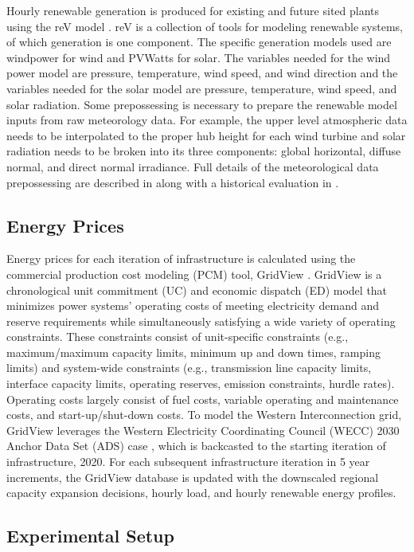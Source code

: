 \documentclass{agujournal2019}
\begin{document}
Hourly renewable generation is produced for existing and future sited plants using the reV model \cite{Maclaurin2019, Buster2023}. reV is a collection of tools for modeling renewable systems, of which generation is one component. The specific generation models used are windpower \cite{windpower} for wind and PVWatts \cite{pvwatts5} for solar. The variables needed for the wind power model are pressure, temperature, wind speed, and wind direction and the variables needed for the solar model are pressure, temperature, wind speed, and solar radiation. Some prepossessing is necessary to prepare the renewable model inputs from raw meteorology data. For example, the upper level atmospheric data needs to be interpolated to the proper hub height for each wind turbine and solar radiation needs to be broken into its three components: global horizontal, diffuse normal, and direct normal irradiance. Full details of the meteorological data prepossessing are described in  along with a historical evaluation in . 

\subsection{Energy Prices}
Energy prices for each iteration of infrastructure is calculated using the commercial production cost modeling (PCM) tool, GridView \cite{hitachi_gridview}. 
GridView is a chronological unit commitment (UC) and economic dispatch (ED) model that minimizes power systems’ operating costs of meeting electricity demand and reserve requirements while simultaneously satisfying a wide variety of operating constraints. These constraints consist of unit-specific constraints (e.g., maximum/maximum capacity limits, minimum up and down times, ramping limits) and system-wide constraints (e.g., transmission line capacity limits, interface capacity limits, operating reserves, emission constraints, hurdle rates). Operating costs largely consist of fuel costs, variable operating and maintenance costs, and start-up/shut-down costs. To model the Western Interconnection grid, GridView leverages the Western Electricity Coordinating Council (WECC) 2030 Anchor Data Set (ADS) case \cite{wecc2021a}, which is backcasted to the starting iteration of infrastructure, 2020. For each subsequent infrastructure iteration in 5 year increments, the GridView database is updated with the downscaled regional capacity expansion decisions, hourly load, and hourly renewable energy profiles.

\subsection{Experimental Setup}
\end{document}
